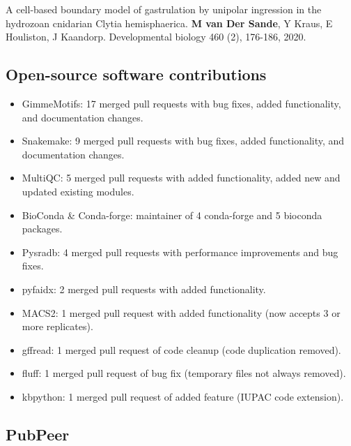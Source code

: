 \noindent
A cell-based boundary model of gastrulation by unipolar ingression in the hydrozoan cnidarian Clytia hemisphaerica. \textbf{M van Der Sande}, Y Kraus, E Houliston, J Kaandorp. Developmental biology 460 (2), 176-186, 2020. \cite{vanderSande2020}


\subsection{Open-source software contributions}

\begin{itemize}
    \item GimmeMotifs: 17 merged pull requests with bug fixes, added functionality, and documentation changes.
    \item Snakemake: 9 merged pull requests with bug fixes, added functionality, and documentation changes.
    \item MultiQC: 5 merged pull requests  with added functionality, added new and updated existing modules.
    \item BioConda \& Conda-forge:  maintainer of 4 conda-forge and 5 bioconda packages.
    \item Pysradb: 4 merged pull requests with performance improvements and bug fixes.
    \item pyfaidx: 2 merged pull requests with added functionality.
    \item MACS2: 1 merged pull request with added functionality (now accepts 3 or more replicates).
    \item gffread: 1 merged pull request of code cleanup (code duplication removed).
    \item fluff: 1 merged pull request of bug fix (temporary files not always removed).
    \item kbpython: 1 merged pull request of added feature (IUPAC code extension).
    \end{itemize}

\subsection{PubPeer}




